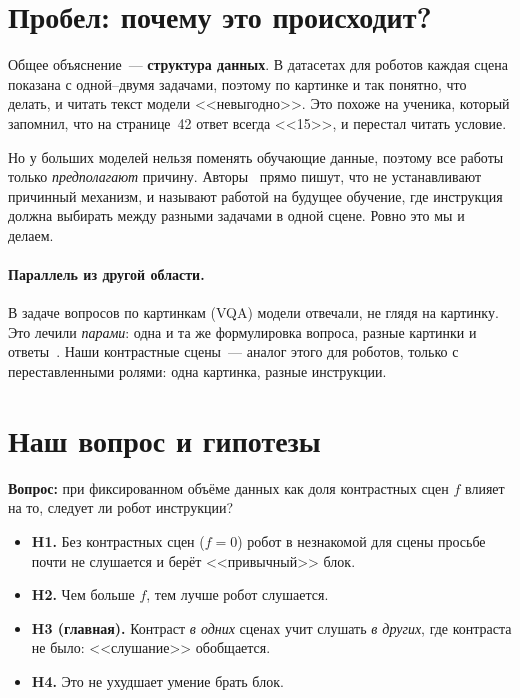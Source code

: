 \documentclass[11pt]{article}
\begin{document}
\section{Пробел: почему это происходит?}

Общее объяснение~--- \textbf{структура данных}. В датасетах для роботов каждая сцена показана
с одной--двумя задачами, поэтому по картинке и так понятно, что делать, и читать текст модели
<<невыгодно>>. Это похоже на ученика, который запомнил, что на странице~42 ответ всегда <<15>>,
и перестал читать условие.

Но у больших моделей нельзя поменять обучающие данные, поэтому все работы только \emph{предполагают}
причину. Авторы~\citep{jiang2026encoded} прямо пишут, что не устанавливают причинный механизм,
и называют работой на будущее обучение, где инструкция должна выбирать между разными задачами в одной сцене.
Ровно это мы и делаем.

\paragraph{Параллель из другой области.} В задаче вопросов по картинкам (VQA) модели отвечали,
не глядя на картинку. Это лечили \emph{парами}: одна и та же формулировка вопроса, разные
картинки и ответы~\citep{goyal2017vqa}. Наши контрастные сцены~--- аналог этого для роботов,
только с переставленными ролями: одна картинка, разные инструкции.

\section{Наш вопрос и гипотезы}

\textbf{Вопрос:} при фиксированном объёме данных как доля контрастных сцен $f$ влияет на то,
следует ли робот инструкции?

\begin{itemize}
\item \textbf{H1.} Без контрастных сцен ($f=0$) робот в незнакомой для сцены просьбе почти не
слушается и берёт <<привычный>> блок.
\item \textbf{H2.} Чем больше $f$, тем лучше робот слушается.
\item \textbf{H3 (главная).} Контраст \emph{в одних} сценах учит слушать \emph{в других},
где контраста не было: <<слушание>> обобщается.
\item \textbf{H4.} Это не ухудшает умение брать блок.
\end{itemize}
\end{document}
